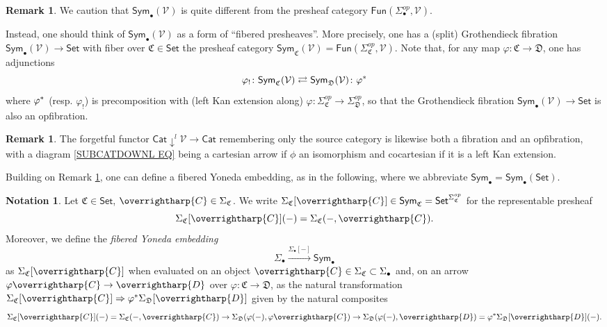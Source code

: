 \documentclass[a4paper,10pt
,draft
]{article}%
\numberwithin{equation}{section}
\numberwithin{figure}{section}
\theoremstyle{definition} %
\newtheorem{remark}[equation]{Remark}%
\newtheorem{notation}[equation]{Notation}%
\newcommand{\vect}[1]{\text{\overrightharp{\ensuremath{#1}}}}
\newcommand{\Sym}{\ensuremath{\mathsf{Sym}}}%
\newcommand{\V}{\ensuremath{\mathcal V}}
\newcommand{\1}{\ensuremath{\mathbbm 1}}%
\begin{document}
\begin{remark}\label{COLCHADJ REM}
We caution that 
$\mathsf{Sym}_{\bullet}(\V)$
is quite different from the presheaf category 
$\mathsf{Fun}(\Sigma_{\bullet}^{op},\V)$.

Instead, one should think of 
$\mathsf{Sym}_{\bullet}(\V)$
as a form of ``fibered presheaves''.
More precisely, 
one has a (split) Grothendieck fibration
$\mathsf{Sym}_{\bullet}(\V) \to \mathsf{Set}$
with fiber over 
$\mathfrak{C} \in \mathsf{Set}$
the presheaf category
$\Sym_{\mathfrak C}(\V)=
\mathsf{Fun}(\Sigma_{\mathfrak{C}}^{op},\mathcal{V})$.
Note that,
for any map $\varphi \colon \mathfrak{C} \to \mathfrak{D}$,
one has adjunctions
\begin{equation}\label{COLCHADJ EQ}
\varphi_! \colon \Sym_{\mathfrak C}(\V) 
\rightleftarrows 
\Sym_{\mathfrak D}(\V) \colon \varphi^{\**}
\end{equation}
where $\varphi^{\**}$
(resp. $\varphi_!$)
is precomposition with (left Kan extension along)
$\varphi\colon 
\Sigma^{op}_{\mathfrak{C}}
\to 
\Sigma^{op}_{\mathfrak{D}}$,
so that the Grothendieck fibration
$\mathsf{Sym}_{\bullet}(\V) \to \mathsf{Set}$
is also an opfibration. 
\end{remark}


\begin{remark}\label{SUBCOCART REM}
The forgetful functor $\mathsf{Cat} \downarrow^l \mathcal{V} \to \mathsf{Cat}$
remembering only the source category is likewise both a fibration and an opfibration, 
with a diagram \eqref{SUBCATDOWNL EQ}
being a cartesian arrow if  $\phi$ an isomorphism
and cocartesian if it is a left Kan extension. 
\end{remark}


Building on Remark \ref{COLCHADJ REM},
one can define a fibered Yoneda embedding, as in the following,
where we abbreviate
$\mathsf{Sym}_{\bullet} = \mathsf{Sym}_{\bullet}(\mathsf{Set})$.

\begin{notation}\label{FIBYON NOT}
Let $\mathfrak{C} \in \mathsf{Set}$, $\vect{C} \in \Sigma_{\mathfrak{C}}$.
We write
$\Sigma_{\mathfrak{C}}[\vect{C}] 
\in \mathsf{Sym}_{\mathfrak{C}} = \mathsf{Set}^{\Sigma_{\mathfrak{C}}^{op}}$ for the representable presheaf
\[\Sigma_{\mathfrak{C}}[\vect{C}](-)
= \Sigma_{\mathfrak{C}}(-,\vect{C}).\]
Moreover, we define the \emph{fibered Yoneda embedding}
\begin{equation}\label{FIBYON EQ}
\Sigma_{\bullet} \xrightarrow{\Sigma_{\bullet}[-]} \mathsf{Sym}_{\bullet}
\end{equation}
as $\Sigma_{\mathfrak{C}}[\vect{C}]$
when evaluated on an object
$\vect{C} \in \Sigma_{\mathfrak{C}} \subset \Sigma_{\bullet}$
and, on an arrow 
$\varphi \vect{C} \to \vect{D}$
over $\varphi \colon \mathfrak{C} \to \mathfrak{D}$,
as the natural transformation
$\Sigma_{\mathfrak{C}}[\vect{C}]
\Rightarrow
\varphi^{\**}
\Sigma_{\mathfrak{D}}[\vect{D}]
$ given by the natural composites
\[\Sigma_{\mathfrak{C}}[\vect{C}](-)
= \Sigma_{\mathfrak{C}}(-,\vect{C})
\to 
\Sigma_{\mathfrak{D}}(\varphi(-),\varphi\vect{C})
\to
\Sigma_{\mathfrak{D}}(\varphi(-),\vect{D})
=
\varphi^{\**} \Sigma_{\mathfrak{D}}[\vect{D}](-).
\]
\end{notation}
\end{document}
